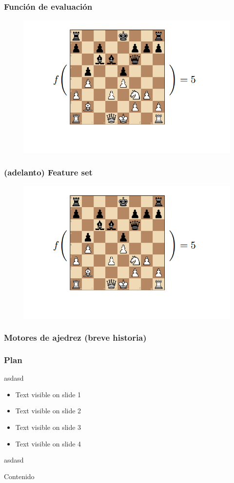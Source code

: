\begin{frame}
\frametitle{Función de evaluación}
\begin{figure}
    \centering
    \includegraphics[width=0.8\linewidth]{../assets/slides/eval.png}
\end{figure}
\end{frame}

\begin{frame}
\frametitle{(adelanto) Feature set}
\begin{figure}
    \centering
    \includegraphics[width=0.8\linewidth]{../assets/slides/eval.png}
\end{figure}
\end{frame}

\begin{frame}
\frametitle{Motores de ajedrez (breve historia)}


\end{frame}






\begin{frame}
\frametitle{Plan}

asdasd

\begin{itemize}
\item<1-> Text visible on slide 1
\item<2-> Text visible on slide 2
\item<3> Text visible on slide 3
\item<4-> Text visible on slide 4
\end{itemize}

asdasd

\end{frame}


\begin{frame}{Contenido}
\tableofcontents
\end{frame}
